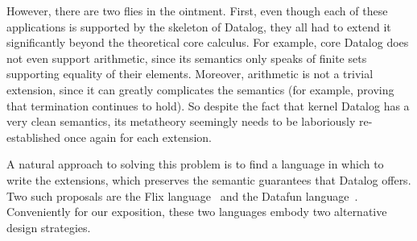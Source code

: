 However, there are two flies in the ointment. First, even though each
of these applications is supported by the skeleton of Datalog, they
all had to extend it significantly beyond the theoretical core
calculus.  For example, core Datalog does not even support arithmetic,
since its semantics only speaks of finite sets supporting equality of
their elements. Moreover, arithmetic is not a trivial extension, since
it can greatly complicates the semantics (for example, proving that
termination continues to hold). So despite the fact that kernel
Datalog has a very clean semantics, its metatheory seemingly needs to
be laboriously re-established once again for each extension.

A natural approach to solving this problem is to find a language in
which to write the extensions, which preserves the semantic guarantees
that Datalog offers. Two such proposals are the Flix
language~\cite{flix} and the Datafun language~\cite{datafun}. 
Conveniently for our exposition, these two languages embody two
alternative design strategies.

%
%
%
%
%
%
%


